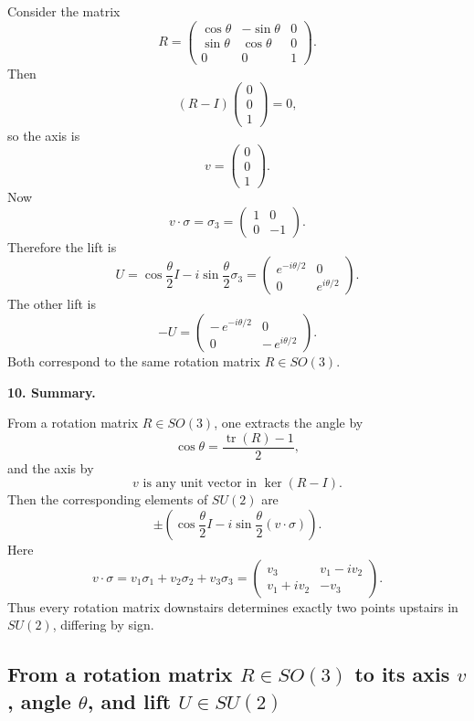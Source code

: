 \documentclass[12pt,a4paper]{article}
\theoremstyle{notespace}
\begin{document}
Consider the matrix
\[
R=
\begin{pmatrix}
	\cos\theta & -\sin\theta & 0\\
	\sin\theta & \cos\theta & 0\\
	0&0&1
\end{pmatrix}.
\]
Then
\[
(R-I)
\begin{pmatrix}
	0\\
	0\\
	1
\end{pmatrix}
=0,
\]
so the axis is
\[
v=
\begin{pmatrix}
	0\\
	0\\
	1
\end{pmatrix}.
\]
Now
\[
v\cdot \sigma = \sigma_3=
\begin{pmatrix}
	1&0\\
	0&-1
\end{pmatrix}.
\]
Therefore the lift is
\[
U=
\cos\frac{\theta}{2}I-i\sin\frac{\theta}{2}\sigma_3
=
\begin{pmatrix}
	e^{-i\theta/2} & 0\\
	0 & e^{i\theta/2}
\end{pmatrix}.
\]
The other lift is
\[
-U=
\begin{pmatrix}
	-\,e^{-i\theta/2} & 0\\
	0 & -\,e^{i\theta/2}
\end{pmatrix}.
\]
Both correspond to the same rotation matrix \(R\in SO(3)\).

\medskip

\textbf{10. Summary.}

From a rotation matrix \(R\in SO(3)\), one extracts the angle by
\[
\boxed{\cos\theta=\frac{\operatorname{tr}(R)-1}{2}},
\]
and the axis by
\[
\boxed{v\text{ is any unit vector in }\ker(R-I).}
\]
Then the corresponding elements of \(SU(2)\) are
\[
\boxed{
	\pm\left(
	\cos\frac{\theta}{2}I
	-
	i\sin\frac{\theta}{2}(v\cdot \sigma)
	\right).
}
\]
Here
\[
\boxed{
	v\cdot \sigma=v_1\sigma_1+v_2\sigma_2+v_3\sigma_3
	=
	\begin{pmatrix}
		v_3 & v_1-i v_2\\
		v_1+i v_2 & -v_3
	\end{pmatrix}.
}
\]
Thus every rotation matrix downstairs determines exactly two points upstairs in \(SU(2)\), differing by sign.

\subsection{From a rotation matrix \(R\in SO(3)\) to its axis \(v\), angle \(\theta\), and lift \(U\in SU(2)\)}
\end{document}
